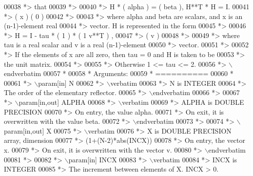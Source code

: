 \begin{DoxyCode}
00038 \textcolor{comment}{*> that}
00039 \textcolor{comment}{*>}
00040 \textcolor{comment}{*>       H * ( alpha ) = ( beta ),   H**T * H = I.}
00041 \textcolor{comment}{*>           (   x   )   (   0  )}
00042 \textcolor{comment}{*>}
00043 \textcolor{comment}{*> where alpha and beta are scalars, and x is an (n-1)-element real}
00044 \textcolor{comment}{*> vector. H is represented in the form}
00045 \textcolor{comment}{*>}
00046 \textcolor{comment}{*>       H = I - tau * ( 1 ) * ( 1 v**T ) ,}
00047 \textcolor{comment}{*>                     ( v )}
00048 \textcolor{comment}{*>}
00049 \textcolor{comment}{*> where tau is a real scalar and v is a real (n-1)-element}
00050 \textcolor{comment}{*> vector.}
00051 \textcolor{comment}{*>}
00052 \textcolor{comment}{*> If the elements of x are all zero, then tau = 0 and H is taken to be}
00053 \textcolor{comment}{*> the unit matrix.}
00054 \textcolor{comment}{*>}
00055 \textcolor{comment}{*> Otherwise  1 <= tau <= 2.}
00056 \textcolor{comment}{*> \(\backslash\)endverbatim}
00057 \textcolor{comment}{*}
00058 \textcolor{comment}{*  Arguments:}
00059 \textcolor{comment}{*  ==========}
00060 \textcolor{comment}{*}
00061 \textcolor{comment}{*> \(\backslash\)param[in] N}
00062 \textcolor{comment}{*> \(\backslash\)verbatim}
00063 \textcolor{comment}{*>          N is INTEGER}
00064 \textcolor{comment}{*>          The order of the elementary reflector.}
00065 \textcolor{comment}{*> \(\backslash\)endverbatim}
00066 \textcolor{comment}{*>}
00067 \textcolor{comment}{*> \(\backslash\)param[in,out] ALPHA}
00068 \textcolor{comment}{*> \(\backslash\)verbatim}
00069 \textcolor{comment}{*>          ALPHA is DOUBLE PRECISION}
00070 \textcolor{comment}{*>          On entry, the value alpha.}
00071 \textcolor{comment}{*>          On exit, it is overwritten with the value beta.}
00072 \textcolor{comment}{*> \(\backslash\)endverbatim}
00073 \textcolor{comment}{*>}
00074 \textcolor{comment}{*> \(\backslash\)param[in,out] X}
00075 \textcolor{comment}{*> \(\backslash\)verbatim}
00076 \textcolor{comment}{*>          X is DOUBLE PRECISION array, dimension}
00077 \textcolor{comment}{*>                         (1+(N-2)*abs(INCX))}
00078 \textcolor{comment}{*>          On entry, the vector x.}
00079 \textcolor{comment}{*>          On exit, it is overwritten with the vector v.}
00080 \textcolor{comment}{*> \(\backslash\)endverbatim}
00081 \textcolor{comment}{*>}
00082 \textcolor{comment}{*> \(\backslash\)param[in] INCX}
00083 \textcolor{comment}{*> \(\backslash\)verbatim}
00084 \textcolor{comment}{*>          INCX is INTEGER}
00085 \textcolor{comment}{*>          The increment between elements of X. INCX > 0.}

\end{DoxyCode}
